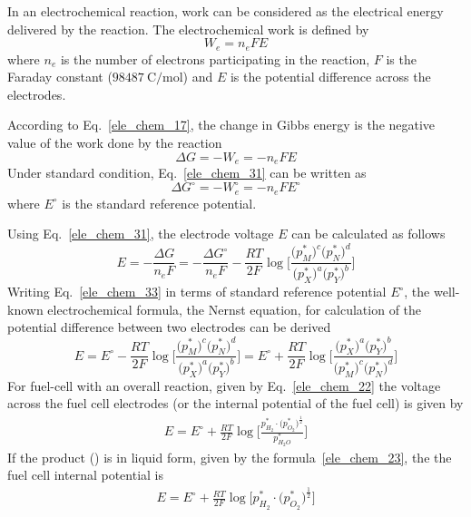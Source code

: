 \documentclass[11pt,a4paper]{article}
\numberwithin{equation}{section}
\theoremstyle{it}
\theoremstyle{definition}
\begin{document}
In an electrochemical reaction, work can be considered as the electrical energy delivered by the reaction. The electrochemical work is defined by
\begin{equation}\label{ele_chem_30}
W_e=n_eFE
\end{equation}
where $n_e$ is the number of electrons participating in the reaction, $F$ is the Faraday constant ($\SI{98487}{\coulomb\per\mole}$) and $E$ is the potential difference across the electrodes.

According to Eq.~\eqref{ele_chem_17}, the change in Gibbs energy is the negative value of the work done by the reaction
\begin{equation}\label{ele_chem_31}
	\Delta G = -W_e=-n_eFE
\end{equation}
Under standard condition, Eq.~\eqref{ele_chem_31} can be written as
\begin{equation}\label{ele_chem_32}
	\Delta G^\circ = -W_e^\circ=-n_eFE^\circ
\end{equation}
where $E^\circ$ is the standard reference potential.

Using Eq.~\eqref{ele_chem_31}, the electrode voltage $E$ can be calculated as follows
\begin{equation}\label{ele_chem_33}
	E = -\frac{\Delta G}{n_eF} = -\frac{\Delta G^\circ}{n_eF} - \frac{RT}{2F}\log{\Bigg[\frac{\Big({p_M^*}\Big)^c\Big({p_N^*}\Big)^d}{\Big({p_X^*}\Big)^a\Big({p_Y^*}\Big)^b}\Bigg]}
\end{equation}
Writing Eq.~\eqref{ele_chem_33} in terms of standard reference potential $E^\circ$, the well-known electrochemical formula, the Nernst equation, for calculation of the potential difference between two electrodes can be derived
\begin{equation}\label{ele_chem_34}
	E = E^\circ -  \frac{RT}{2F}\log{\Bigg[\frac{\Big({p_M^*}\Big)^c \Big({p_N^*}\Big)^d}{\Big({p_X^*}\Big)^a\Big({p_Y^*}\Big)^b}\Bigg]} = E^\circ +  \frac{RT}{2F}\log{\Bigg[\frac{\Big({p_X^*}\Big)^a\Big({p_Y^*}\Big)^b}{\Big({p_M^*}\Big)^c\Big({p_N^*}\Big)^d}\Bigg]}
\end{equation}
For fuel-cell with an overall reaction, given by Eq.~\eqref{ele_chem_22} the voltage across the fuel cell electrodes (or the internal potential of the fuel cell) is given by
\begin{equation}\label{ele_chem_35}
	\begin{aligned}
		E = E^\circ + \frac{RT}{2F}\log\Bigg[\frac{{p_{H_2}^*\cdot\Big(p_{O_2}^*\Big)^{\frac{1}{2}}}}{p_{H_2O}^*}\Bigg]
	\end{aligned}
\end{equation}
If the product () is in liquid form, given by the formula~\ref{ele_chem_23}, the the fuel cell internal potential is 
\begin{equation}\label{ele_chem_36}
	\begin{aligned}
		E = E^\circ + \frac{RT}{2F}\log\Bigg[{{p_{H_2}^*\cdot\Big(p_{O_2}^*\Big)^{\frac{1}{2}}}}\Bigg]
	\end{aligned}
\end{equation}
\end{document}
